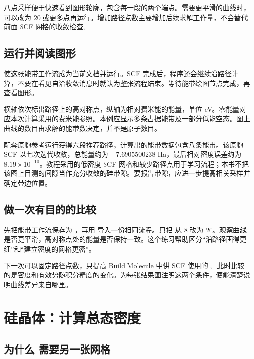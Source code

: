 八点采样便于快速看到图形轮廓，包含每一段的两个端点。需要更平滑的曲线时，可以改为 $20$ 或更多点再运行。增加路径点数主要增加后续求解工作量，不会替代前面 SCF 网格的收敛检查。

\subsection{运行并阅读图形}

使这张能带工作流成为当前文档并运行。SCF 完成后，程序还会继续沿路径计算，不要在看见自洽收敛消息时就认为整张流程结束。等待能带绘图节点完成，再查看图形。

横轴依次标出路径上的高对称点，纵轴为相对费米能的能量，单位 eV。零能量对应本次计算采用的费米能参照。本例应显示多条占据能带及一部分低能空态。图上曲线的数目由求解的能带数决定，并不是原子数目。


配套原胞参考运行获得六段推荐路径，计算出的能带数据包含八条能带。该原胞 SCF 以七次迭代收敛，总能量约为 $-7.6905500238$ Ha，最后相对密度误差约为 $8.19\times10^{-10}$。教程采用的低密度 SCF 网格和较少路径点用于学习流程；本书不把该图上目测的间隙当作充分收敛的硅带隙。要报告带隙，应进一步提高相关采样并确定带边位置。

\subsection{做一次有目的的比较}

先把能带工作流保存为 ，再用  导入一份相同流程。只把 \mbox{} 从 $8$ 改为 $20$。观察曲线是否更平滑，高对称点处的能量是否保持一致。这个练习帮助区分“沿路径画得更细”和“建立密度的网格更密”。

下一次可以固定路径点数，只提高 Build Molecule 中供 SCF 使用的 \mbox{}。此时比较的是密度和有效势随积分精度的变化。为每张结果图注明这两个条件，便能清楚说明曲线差异来自哪里。

\section{硅晶体：计算总态密度}

\subsection{为什么  需要另一张网格}

